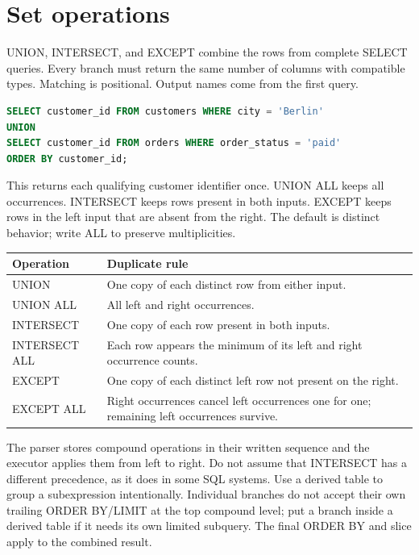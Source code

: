 \section{Set operations}

UNION, INTERSECT, and EXCEPT combine the rows from complete SELECT queries. Every branch must return the same number of columns with compatible types. Matching is positional. Output names come from the first query.

\begin{lstlisting}[language=SQL]
SELECT customer_id FROM customers WHERE city = 'Berlin'
UNION
SELECT customer_id FROM orders WHERE order_status = 'paid'
ORDER BY customer_id;
\end{lstlisting}

This returns each qualifying customer identifier once. UNION ALL keeps all occurrences. INTERSECT keeps rows present in both inputs. EXCEPT keeps rows in the left input that are absent from the right. The default is distinct behavior; write ALL to preserve multiplicities.

\begin{longtable}{p{.25\linewidth}p{.68\linewidth}}
\toprule
Operation & Duplicate rule \\
\midrule
\endhead
UNION & One copy of each distinct row from either input. \\
UNION ALL & All left and right occurrences. \\
INTERSECT & One copy of each row present in both inputs. \\
INTERSECT ALL & Each row appears the minimum of its left and right occurrence counts. \\
EXCEPT & One copy of each distinct left row not present on the right. \\
EXCEPT ALL & Right occurrences cancel left occurrences one for one; remaining left occurrences survive. \\
\bottomrule
\end{longtable}

The parser stores compound operations in their written sequence and the executor applies them from left to right. Do not assume that INTERSECT has a different precedence, as it does in some SQL systems. Use a derived table to group a subexpression intentionally. Individual branches do not accept their own trailing ORDER BY/LIMIT at the top compound level; put a branch inside a derived table if it needs its own limited subquery. The final ORDER BY and slice apply to the combined result.

